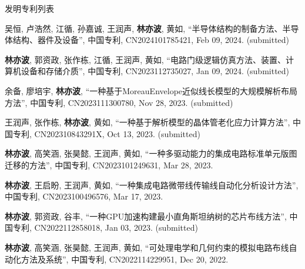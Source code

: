 \begin{rSection}{发明专利列表}



\begin{description}[font=\normalfont, rightmargin=2em]
    

\item[{[P18]}]{
        吴恒, 卢浩然, 江循, 孙嘉诚, 王润声, \textbf{林亦波}, 黄如, 
    ``半导体结构的制备方法、半导体结构、器件及设备'', 
    中国专利, CN2024101785421, Feb 09, 2024.
    (submitted)
}
            

\item[{[P17]}]{
        \textbf{林亦波}, 郭资政, 张作栋, 江循, 王润声, 黄如, 
    ``电路门级逻辑仿真方法、装置、计算机设备和存储介质'', 
    中国专利, CN2023112735027, Jan 09, 2024.
    (submitted)
}
            

\item[{[P16]}]{
        余备, 廖培宇, \textbf{林亦波}, 
    ``一种基于MoreauEnvelope近似线长模型的大规模解析布局方法'', 
    中国专利, CN2023111300780, Nov 28, 2023.
    (submitted)
}
            

\item[{[P15]}]{
        王润声, 张作栋, \textbf{林亦波}, 黄如, 
    ``一种基于解析模型的晶体管老化应力计算方法'', 
    中国专利, CN202310843291X, Oct 13, 2023.
    (submitted)
}
            

\item[{[P14]}]{
        \textbf{林亦波}, 高笑涵, 张昊懿, 王润声, 黄如, 
    ``一种多驱动能力的集成电路标准单元版图迁移的方法'', 
    中国专利, CN2023101249631, Mar 28, 2023.
    
}
            

\item[{[P13]}]{
        \textbf{林亦波}, 王启盼, 王润声, 黄如, 
    ``一种集成电路微带线传输线自动化分析设计方法'', 
    中国专利, CN2023100496576, Mar 17, 2023.
    
}
            

\item[{[P12]}]{
        \textbf{林亦波}, 郭资政, 谷丰, 
    ``一种GPU加速构建最小直角斯坦纳树的芯片布线方法'', 
    中国专利, CN2022112858018, Jan 03, 2023.
    (submitted)
}
            

\item[{[P11]}]{
        \textbf{林亦波}, 高笑涵, 张昊懿, 王润声, 黄如, 
    ``可处理电学和几何约束的模拟电路布线自动化方法及系统'', 
    中国专利, CN2022114229951, Dec 20, 2022.
    
}
            


\end{description}
\end{rSection}
